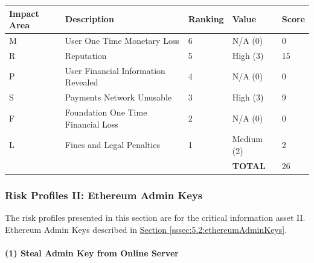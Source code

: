 \documentclass[12pt]{article} %
\newcommand{\hypersectionref}[1]{\hyperref[#1]{Section \ref{#1}}}
\begin{document}
{\begin{center}
\begin{tabular}{ | l | l | l | l | l |}
  \hline
  \textbf{Impact Area} & \textbf{Description} & \textbf{Ranking} & \textbf{Value} & \textbf{Score}
  \\ \hline
  M & User One Time Monetary Loss			& 6	& N/A (0)		& 0
  \\ \hline
  R & Reputation		& 5	& High (3)		& 15
  \\ \hline
  P & User Financial Information Revealed		& 4	& N/A (0)		& 0
  \\ \hline
  S & Payments Network Unusable					& 3	& High (3)		& 9
  \\ \hline
  F & Foundation One Time Financial Loss	& 2	& N/A (0)		& 0
  \\ \hline
  L & Fines and Legal Penalties						& 1	& Medium (2)	& 2
  \\ \hline
  & & & \textbf{TOTAL} & 26
  \\ \hline
\end{tabular}
\end{center}
\label{tab:severityEthereumScalability}

\subsubsection{Risk Profiles II: Ethereum Admin Keys} \label{sssec:5.3:ethereumAdminKeysRiskProfiles}

The risk profiles presented in this section are for the critical information asset II. Ethereum Admin Keys described in \hypersectionref{sssec:5.2:ethereumAdminKeys}.

\paragraph{(1) Steal Admin Key from Online Server }

}
\end{document}
